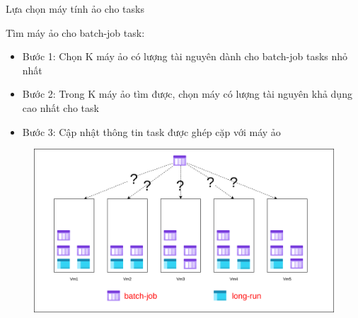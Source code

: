 \documentclass[11pt,xcolor={dvipsnames}, aspectratio=169]{beamer}
\begin{document}
\begin{frame}
{Lựa chọn máy tính ảo cho tasks}

	\begin{minipage}[t]{0.4\linewidth}
		\vspace{0.5cm}
		Tìm máy ảo cho batch-job task: 
		\begin{itemize}
			\item Bước 1: Chọn K máy ảo có lượng tài nguyên dành cho batch-job tasks nhỏ nhất 
			\item Bước 2: Trong K máy ảo tìm được, chọn máy có lượng tài nguyên khả dụng cao nhất cho task 
			\item Bước 3: Cập nhật thông tin task được ghép cặp với máy ảo
		\end{itemize}
	\end{minipage}
	\hfill
	\begin{minipage}[t]{0.59\linewidth}
	\begin{figure}
		\vspace{1cm}
		\includegraphics[scale=0.35]{images/balancing_tasks6.png}
	\end{figure}
	\vspace{1cm}
	\end{minipage}
\end{frame}
\end{document}
